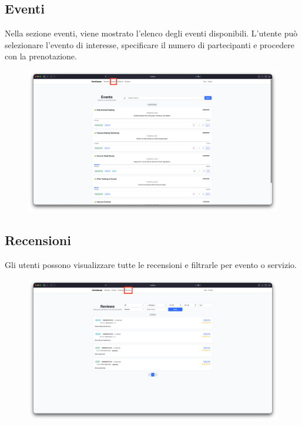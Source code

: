 \documentclass[a4paper,12pt]{report}
\begin{document}
\subsection*{Eventi}
Nella sezione eventi, viene mostrato l'elenco degli eventi
disponibili. L'utente può selezionare
l'evento di interesse, specificare il numero di partecipanti e
procedere con la prenotazione.

\begin{figure}[H]
  \centering
  \includegraphics[width=\textwidth, trim=0 0 0 0]{./img/users/events.png}
  \vspace{-1em}
  \label{fig:events}
\end{figure}

\subsection*{Recensioni}
Gli utenti possono visualizzare tutte le recensioni e filtrarle per
evento o servizio.

\begin{figure}[H]
  \centering
  \includegraphics[width=\textwidth, trim=0 0 0 0]{./img/users/reviews.png}
  \vspace{-1em}
  \label{fig:recensione}
\end{figure}
\end{document}
